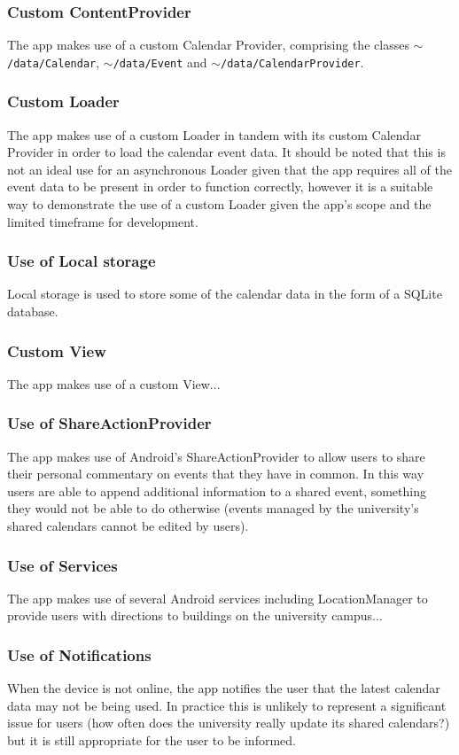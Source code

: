 \documentclass{article}
\def\code#1{\texttt{#1}} %
\begin{document}
\subsubsection{Custom ContentProvider}
The app makes use of a custom Calendar Provider, comprising the classes \code{$\mathtt{\sim}$/data/Calendar}, \code{$\mathtt{\sim}$/data/Event} and \code{$\mathtt{\sim}$/data/CalendarProvider}.
\subsubsection{Custom Loader}
The app makes use of a custom Loader in tandem with its custom Calendar Provider in order to load the calendar event data. It should be noted that this is not an ideal use for an asynchronous Loader given that the app requires all of the event data to be present in order to function correctly, however it is a suitable way to demonstrate the use of a custom Loader given the app's scope and the limited timeframe for development.
\subsubsection{Use of Local storage}
Local storage is used to store some of the calendar data in the form of a SQLite database.
\subsubsection{Custom View}
The app makes use of a custom View...
\subsubsection{Use of ShareActionProvider}
The app makes use of Android's ShareActionProvider to allow users to share their personal commentary on events that they have in common. In this way users are able to append additional information to a shared event, something they would not be able to do otherwise (events managed by the university's shared calendars cannot be edited by users).
\subsubsection{Use of Services}
The app makes use of several Android services including LocationManager to provide users with directions to buildings on the university campus... 
\subsubsection{Use of Notifications}
When the device is not online, the app notifies the user that the latest calendar data may not be being used. In practice this is unlikely to represent a significant issue for users (how often does the university really update its shared calendars?) but it is still appropriate for the user to be informed.
\end{document}
